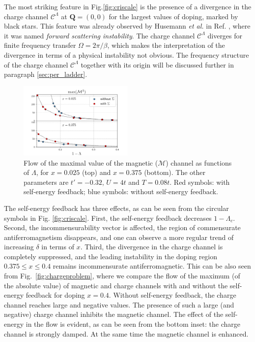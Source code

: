 The most striking feature in Fig.\ref{fig:criscale} is the presence of a divergence in the charge channel $\mathcal{C}^\Lambda$ at $\mathbf{Q}=(0,0)$ for the largest values of doping, marked by black stars. 
This feature was already observed by Husemann \textit{et al.} in Ref. , where it was named \textit{forward scattering instability}. 
The charge channel $\mathcal{C}^\Lambda$ diverges for finite frequency transfer $\Omega=2\pi/\beta$, which makes the interpretation of the divergence in terms of a physical instability not obvious. 
The frequency structure of the charge channel $\mathcal{C}^\Lambda$ together with its origin will be discussed further in paragraph \ref{sec:per_ladder}.

\begin{figure}
\includegraphics[width=0.50\textwidth]{images/chargeproblem_M_vs_Lambda_diff_occ.png}
\caption{Flow of the maximal value of the  magnetic ($\mathcal{M}$) channel as functions of $\Lambda$, for  $x=0.025$ (top) and $x=0.375$ (bottom). The other parameters are $t'=-0.32$, $U=4t$ and $T=0.08t$. Red symbols: with self-energy feedback; blue symbols: without self-energy feedback. }
\label{fig:selfeffect}
\end{figure}

The self-energy feedback has three effects, as can be seen from the circular symbols in Fig. \ref{fig:criscale}. 
First, the self-energy feedback decreases $1-\Lambda_c$.
Second, the incommensurability vector is affected, the region of commensurate antiferromagnetism disappears, and one can observe a more regular trend of increasing $\delta$ in terms of $x$.
Third, the divergence in the charge channel is completely suppressed, and the leading instability in the doping region $0.375\le x \le 0.4$ remains incommensurate antiferromagnetic. 
This can be also seen from Fig.~\ref{fig:chargeproblem}, where we compare the flow of the maximum (of the absolute value) of magnetic and charge channels with and without the self-energy feedback for doping $x=0.4$.
Without self-energy feedback, the charge channel reaches large and negative values.
The presence of such a large (and negative) charge channel inhibits the magnetic channel.    
The effect of the self-energy in the flow is evident, as can be seen from the bottom inset: the charge channel is strongly damped.  
At the same time the magnetic channel is enhanced.

